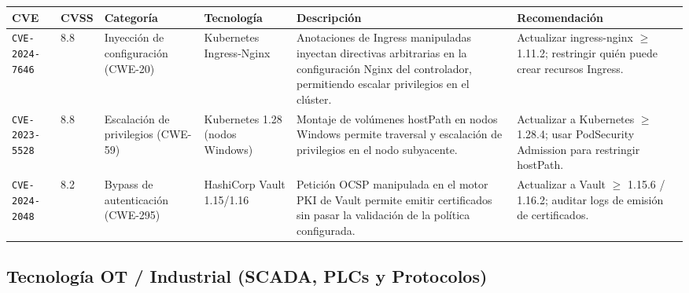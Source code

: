 \documentclass[letterpaper,11pt]{article}
\begin{document}
\begingroup\footnotesize
{}
\begin{tabular}{|p{2.3cm}|p{0.65cm}|p{1.9cm}|p{2.0cm}|p{3.9cm}|p{3.0cm}|}
\hline
\rowcolor{blue!15}
\textbf{CVE} & \textbf{CVSS} & \textbf{Categoría} & \textbf{Tecnología} & \textbf{Descripción} & \textbf{Recomendación} \\
\hline
\texttt{CVE-2024-7646} & 8.8 & Inyección de configuración (CWE-20) & Kubernetes Ingress-Nginx & Anotaciones de Ingress manipuladas inyectan directivas arbitrarias en la configuración Nginx del controlador, permitiendo escalar privilegios en el clúster. & Actualizar ingress-nginx $\geq$ 1.11.2; restringir quién puede crear recursos Ingress. \\
\hline
\texttt{CVE-2023-5528} & 8.8 & Escalación de privilegios (CWE-59) & Kubernetes 1.28 (nodos Windows) & Montaje de volúmenes hostPath en nodos Windows permite traversal y escalación de privilegios en el nodo subyacente. & Actualizar a Kubernetes $\geq$ 1.28.4; usar PodSecurity Admission para restringir hostPath. \\
\hline
\texttt{CVE-2024-2048} & 8.2 & Bypass de autenticación (CWE-295) & HashiCorp Vault 1.15/1.16 & Petición OCSP manipulada en el motor PKI de Vault permite emitir certificados sin pasar la validación de la política configurada. & Actualizar a Vault $\geq$ 1.15.6 / 1.16.2; auditar logs de emisión de certificados. \\
\hline
\end{tabular}
\endgroup

\subsection{Tecnología OT / Industrial (SCADA, PLCs y Protocolos)}
\end{document}
